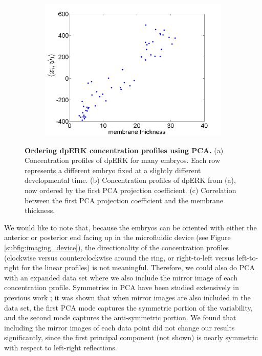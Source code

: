 \documentclass[10pt]{article}
\begin{document}
\begin{figure}[H]
\begin{subfigure}{0.3\textwidth}
\includegraphics[width=\textwidth]{PCA_time_corr}
\caption{}
\end{subfigure}
\caption{{\bf Ordering dpERK concentration profiles using PCA.} (a) Concentration profiles of dpERK for many embryos. Each row represents a different embryo fixed at a slightly different developmental time.
(b) Concentration profiles of dpERK from (a), now ordered by the first PCA projection coefficient.
(c) Correlation between the first PCA projection coefficient and the membrane thickness.}
\label{fig:PCA_ordering}
\end{figure}

We would like to note that, because the embryos can be oriented with either the anterior or posterior end facing up in the microfluidic device (see Figure \ref{subfig:imaging_device}), the directionality of the concentration profiles (clockwise versus counterclockwise around the ring, or right-to-left versus left-to-right for the linear profiles) is not meaningful. 
%
Therefore, we could also do PCA with an expanded data set where we also include the mirror image of each concentration profile.
%
Symmetries in PCA have been studied extensively in previous work \cite{holmes1998turbulence}; it was shown that when mirror images are also included in the data set, the first PCA mode captures the symmetric portion of the variability, and the second mode captures the anti-symmetric portion.
%
We found that including the mirror images of each data point did not change our results significantly, since the first principal component (not shown) is nearly symmetric with respect to left-right reflections.
\end{document}
